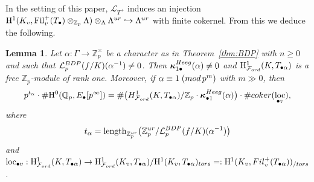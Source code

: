 \documentclass[10pt,reqno]{amsart}
\numberwithin{equation}{section}
\theoremstyle{plain}
\theoremstyle{definition}
\theoremstyle{definition}
\theoremstyle{plain}
\theoremstyle{plain}
\newtheorem{lemma}[thm]{Lemma}
\theoremstyle{plain}
\theoremstyle{plain}
\theoremstyle{plain}
\theoremstyle{plain}
\newcommand{\Fil}{\mathrm{Fil}}
\newcommand{\al}{\alpha} %
\newcommand{\Z}{\mathbb{Z}}
\newcommand{\Q}{\mathbb{Q}}
\newcommand{\Zp}{\mathbb{Z}_{p}}
\newcommand{\bkappa}{\boldsymbol{\kappa}}
\DeclareMathOperator{\loc}{loc}
\newcommand{\Lcal}{\mathcal{L}}
\newcommand{\Fcal}{\mathcal{F}}
\newcommand{\rH}{\mathrm{H}}
\begin{document}
In the setting of this paper, $\mathscr{L}_{T^+}$ induces an injection $\rH^1(K_v, \Fil_v^+(T_\bullet)\otimes_{\Zp}\Lambda)\otimes_\Lambda\Lambda^{\rm ur}\hookrightarrow\Lambda^{\rm ur}$ with finite cokernel.  
From this we deduce the following.


\begin{lemma}\label{lem:erl}
Let $\al: \Gamma \to \Z_p^{\times}$ be a character as in Theorem~\ref{thm:BDP} with $n\geq 0$ and such that $\Lcal_p^{\rm BDP}(f/K)(\al^{-1})\neq 0$. Then $\boldsymbol{\kappa}_{1\bullet}^{\rm Heeg}(\alpha)\neq 0$ and $\rH^1_{\Fcal_{\rm ord}}(K,T_{\bullet\alpha})$ is a free $\Z_p$-module of rank one. Moreover, if $\alpha\equiv 1\;({\rm mod}\,p^m)$ with $m\gg 0$, then
\[
p^{t_\alpha} \cdot\#\rH^0(\Q_p,E_\bullet[p^\infty]) =\# \bigl({\rm H}^1_{\Fcal_{\rm ord}}(K,T_{\bullet\al})/\Z_p\cdot\bkappa^{\rm Heeg}_{\bullet 1}(\al)\bigr)  \cdot \#{\rm coker}(\loc_{\bullet{v}}),
\]
where 
\[
t_\alpha = \mathrm{length}_{\Z_p^{\rm ur}}\bigl(\Z_p^{\rm ur}/\Lcal_p^{\rm BDP}(f/K)(\al^{-1}) \bigr)
\]
and
$\loc_{\bullet{v}}:\rH^1_{\Fcal_{\rm ord}}(K,T_{\bullet\al})\to \rH^1_{\Fcal_{\rm ord}}(K_v,T_{\bullet\al})/\rH^1(K_v,T_{\bullet\al})_{\rm tors}=:\rH^1(K_v, {\rm Fil}_v^+(T_{\bullet\al}))_{/\rm tors}$.
\end{lemma}
\end{document}
